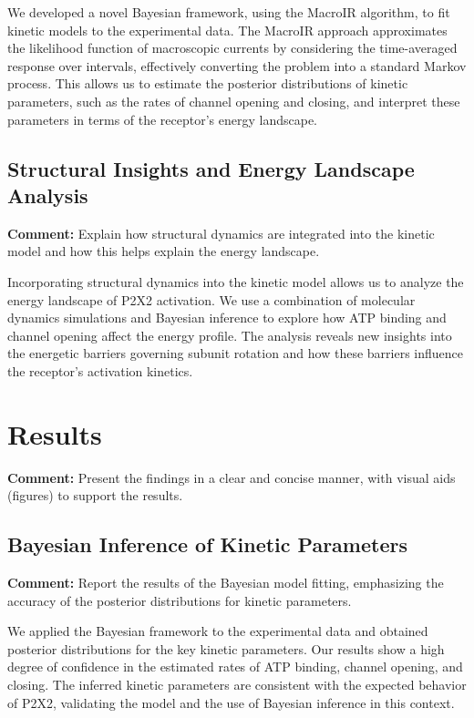\documentclass{article}
\begin{document}
	We developed a novel Bayesian framework, using the MacroIR algorithm, to fit kinetic models to the experimental data. The MacroIR approach approximates the likelihood function of macroscopic currents by considering the time-averaged response over intervals, effectively converting the problem into a standard Markov process. This allows us to estimate the posterior distributions of kinetic parameters, such as the rates of channel opening and closing, and interpret these parameters in terms of the receptor's energy landscape.
	
	\subsection{Structural Insights and Energy Landscape Analysis}
	\textbf{Comment:} Explain how structural dynamics are integrated into the kinetic model and how this helps explain the energy landscape.
	
	Incorporating structural dynamics into the kinetic model allows us to analyze the energy landscape of P2X2 activation. We use a combination of molecular dynamics simulations and Bayesian inference to explore how ATP binding and channel opening affect the energy profile. The analysis reveals new insights into the energetic barriers governing subunit rotation and how these barriers influence the receptor's activation kinetics.
	
	\section{Results}
	\textbf{Comment:} Present the findings in a clear and concise manner, with visual aids (figures) to support the results.
	
	\subsection{Bayesian Inference of Kinetic Parameters}
	\textbf{Comment:} Report the results of the Bayesian model fitting, emphasizing the accuracy of the posterior distributions for kinetic parameters.
	
	We applied the Bayesian framework to the experimental data and obtained posterior distributions for the key kinetic parameters. Our results show a high degree of confidence in the estimated rates of ATP binding, channel opening, and closing. The inferred kinetic parameters are consistent with the expected behavior of P2X2, validating the model and the use of Bayesian inference in this context.
	
\end{document}
